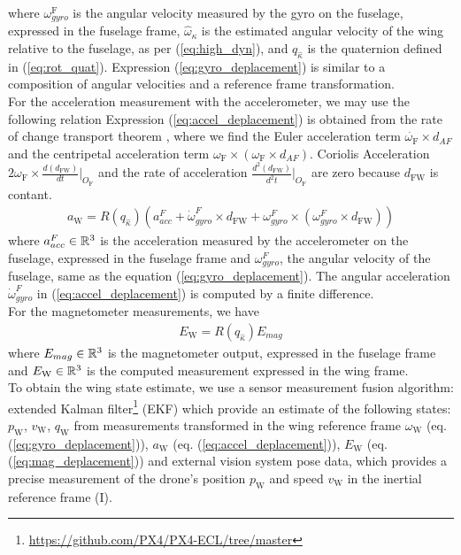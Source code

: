 where $\omega_{gyro}^{\text{F}}$ is the angular velocity measured by the gyro on the fuselage, expressed in the fuselage frame, $\hat{\omega}_{\kappa}$ is the estimated angular velocity of the wing relative to the fuselage, as per (\ref{eq:high_dyn}), and $q_{\hat{\kappa}}$ is the quaternion defined in (\ref{eq:rot_quat}).
Expression (\ref{eq:gyro_deplacement}) is similar to a composition of angular velocities and a reference frame transformation.\\
\indent For the acceleration measurement with the accelerometer, we may use the following relation
Expression (\ref{eq:accel_deplacement}) is obtained from the rate of change transport theorem \cite{brizard2004motion}, where we find the Euler acceleration term $\dot{\omega_{\text{F}}} \times d_{AF}$ and the centripetal acceleration term $\omega_{\text{F}} \times ( \omega_{\text{F}} \times  d_{AF})$. Coriolis Acceleration $2\omega_{\text{F}} \times \frac{d (d_{\text{FW}})}{d t}\Bigr|_{O_{\text{F}}}$ and the rate of acceleration $\frac{d^{2} (d_{\text{FW}})}{d^{2} t}\Bigr|_{O_{\text{F}}}$ are zero because $d_{\text{FW}}$ is contant.
\begin{align}
    \label{eq:accel_deplacement}
    a_{\text{W}} = R(q_{\hat{\kappa}}) \left( a_{acc}^{F} + \dot{\omega}_{gyro}^{F} \times d_{\text{FW}} + \omega_{gyro}^{F} \times ( \omega_{gyro}^{F} \times  d_{\text{FW}}) \right) 
\end{align}
where $a_{acc}^{F} \in {\mathbb R}^{3}$ is the acceleration measured by the accelerometer on the fuselage, expressed in the fuselage frame and $\omega_{gyro}^{F}$, the angular velocity of the fuselage, same as the equation (\ref{eq:gyro_deplacement}). The angular acceleration $\dot{\omega}_{gyro}^{F}$ in (\ref{eq:accel_deplacement}) is computed by a finite difference.\\
\indent For the magnetometer measurements, we have
\begin{align}
    \label{eq:mag_deplacement}
    E_{\text{W}} = R(q_{\hat{\kappa}}) E_{mag}
\end{align}
where $E_{mag} \in {\mathbb R}^{3}$ is the magnetometer output, expressed in the fuselage frame and  $ E_{\text{W}} \in {\mathbb R}^{3}$ is the computed measurement expressed in the wing frame.\\
\indent To obtain the wing state estimate, we use a sensor measurement fusion algorithm: extended Kalman filter\footnote{\url{https://github.com/PX4/PX4-ECL/tree/master}} (EKF) which provide an estimate of the following states: $p_{\text{W}}$, $v_{\text{W}}$, $q_{\text{W}}$ from measurements transformed in the wing reference frame $\omega_{\text{W}}$ (eq. (\ref{eq:gyro_deplacement})), $a_{\text{W}}$ (eq. (\ref{eq:accel_deplacement})), $E_{\text{W}}$ (eq. (\ref{eq:mag_deplacement})) and external vision system pose data, which provides a precise measurement of the drone's position $p_{\text{W}}$ and speed $v_{\text{W}}$ in the inertial reference frame (I).


